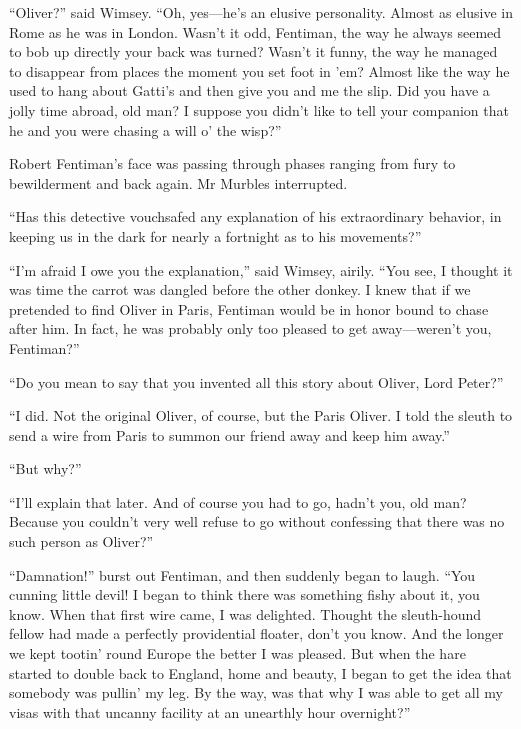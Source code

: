 \enquote{Oliver?} said Wimsey. \enquote{Oh, yes\allowbreak---\allowbreak he's an elusive personality. Almost as elusive in Rome as he was in London. Wasn't it odd, Fentiman, the way he always seemed to bob up directly your back was turned? Wasn't it funny, the way he managed to disappear from places the moment you set foot in 'em? Almost like the way he used to hang about Gatti's and then give you and me the slip. Did you have a jolly time abroad, old man? I suppose you didn't like to tell your companion that he and you were chasing a will o' the wisp?}

Robert Fentiman's face was passing through phases ranging from fury to bewilderment and back again. Mr Murbles interrupted.

\enquote{Has this detective vouchsafed any explanation of his extraordinary behavior, in keeping us in the dark for nearly a fortnight as to his movements?}

\enquote{I'm afraid I owe you the explanation,} said Wimsey, airily. \enquote{You see, I thought it was time the carrot was dangled before the other donkey. I knew that if we pretended to find Oliver in Paris, Fentiman would be in honor bound to chase after him. In fact, he was probably only too pleased to get away\allowbreak---\allowbreak weren't you, Fentiman?}

\enquote{Do you mean to say that you invented all this story about Oliver, Lord Peter?}

\enquote{I did. Not the original Oliver, of course, but the Paris Oliver. I told the sleuth to send a wire from Paris to summon our friend away and keep him away.}

\enquote{But why?}

\enquote{I'll explain that later. And of course you had to go, hadn't you, old man? Because you couldn't very well refuse to go without confessing that there was no such person as Oliver?}

\enquote{Damnation!} burst out Fentiman, and then suddenly began to laugh. \enquote{You cunning little devil! I began to think there was something fishy about it, you know. When that first wire came, I was delighted. Thought the sleuth-hound fellow had made a perfectly providential floater, don't you know. And the longer we kept tootin' round Europe the better I was pleased. But when the hare started to double back to England, home and beauty, I began to get the idea that somebody was pullin' my leg. By the way, was that why I was able to get all my visas with that uncanny facility at an unearthly hour overnight?}

